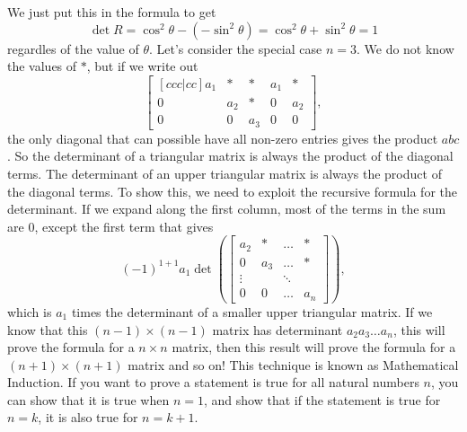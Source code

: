 We just put this in the formula to get \[
	\det R = \cos^2\theta - (-\sin^2\theta) = \cos^2\theta + \sin^2\theta = 1
\]
regardles of the value of $\theta$.
Let's consider the special case $n=3$. We do not know the values of $*$, but if we write out \[
	\begin{bmatrix}[ccc|cc]
		a_1&*&*&a_1&*\\0&a_2&*&0&a_2\\0&0&a_3&0&0
	\end{bmatrix},\]
the only diagonal that can possible have all non-zero entries gives the product $abc$. So the determinant of a triangular matrix is always the product of the diagonal terms.
The determinant of an upper triangular matrix is always the product of the diagonal terms. To show this, we need to exploit the recursive formula for the determinant.
If we expand along the first column, most of the terms in the sum are $0$, except the first term that gives \[
	(-1)^{1+1} a_1 \det \left( \begin{bmatrix}
		 a_2 & *& \ldots&*\\
		0&a_3& \ldots & * \\
		\vdots  & &\ddots& \\
		 0 & 0 & \ldots & a_n
	\end{bmatrix}\right),
\]
which is $a_1$ times the determinant of a smaller upper triangular matrix. If we know that this $(n-1)\times (n-1)$ matrix has determinant $a_2a_3\ldots a_n$, this will prove the formula for a $n\times n$ matrix, then this result will prove the formula for a $(n+1)\times (n+1)$ matrix and so on! This technique is known as Mathematical Induction. If you want to prove a statement is true for all natural numbers $n$, you can show that it is true when $n=1$, and show that if the statement is true for $n=k$, it is also true for $n=k+1$.
